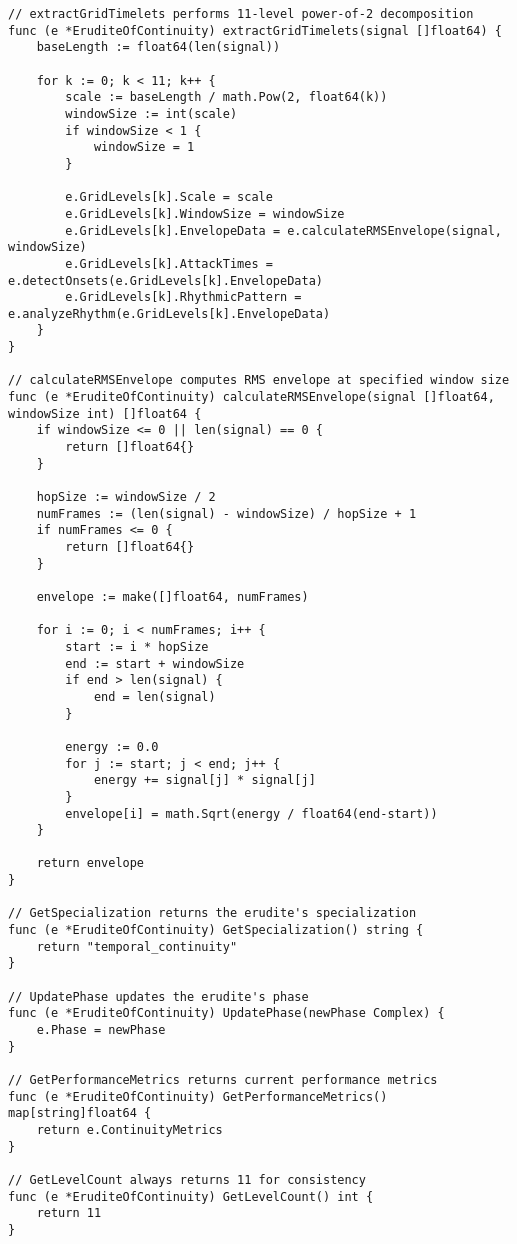 \begin{tcolorbox}[colback=CodeBackground, colframe=DarkGray, title=Erudite of Continuity Implementation, fonttitle=\bfseries]
\begin{verbatim}
// extractGridTimelets performs 11-level power-of-2 decomposition
func (e *EruditeOfContinuity) extractGridTimelets(signal []float64) {
    baseLength := float64(len(signal))
    
    for k := 0; k < 11; k++ {
        scale := baseLength / math.Pow(2, float64(k))
        windowSize := int(scale)
        if windowSize < 1 {
            windowSize = 1
        }
        
        e.GridLevels[k].Scale = scale
        e.GridLevels[k].WindowSize = windowSize
        e.GridLevels[k].EnvelopeData = e.calculateRMSEnvelope(signal, windowSize)
        e.GridLevels[k].AttackTimes = e.detectOnsets(e.GridLevels[k].EnvelopeData)
        e.GridLevels[k].RhythmicPattern = e.analyzeRhythm(e.GridLevels[k].EnvelopeData)
    }
}

// calculateRMSEnvelope computes RMS envelope at specified window size
func (e *EruditeOfContinuity) calculateRMSEnvelope(signal []float64, windowSize int) []float64 {
    if windowSize <= 0 || len(signal) == 0 {
        return []float64{}
    }
    
    hopSize := windowSize / 2
    numFrames := (len(signal) - windowSize) / hopSize + 1
    if numFrames <= 0 {
        return []float64{}
    }
    
    envelope := make([]float64, numFrames)
    
    for i := 0; i < numFrames; i++ {
        start := i * hopSize
        end := start + windowSize
        if end > len(signal) {
            end = len(signal)
        }
        
        energy := 0.0
        for j := start; j < end; j++ {
            energy += signal[j] * signal[j]
        }
        envelope[i] = math.Sqrt(energy / float64(end-start))
    }
    
    return envelope
}

// GetSpecialization returns the erudite's specialization
func (e *EruditeOfContinuity) GetSpecialization() string {
    return "temporal_continuity"
}

// UpdatePhase updates the erudite's phase
func (e *EruditeOfContinuity) UpdatePhase(newPhase Complex) {
    e.Phase = newPhase
}

// GetPerformanceMetrics returns current performance metrics
func (e *EruditeOfContinuity) GetPerformanceMetrics() map[string]float64 {
    return e.ContinuityMetrics
}

// GetLevelCount always returns 11 for consistency
func (e *EruditeOfContinuity) GetLevelCount() int {
    return 11
}
\end{verbatim}
\end{tcolorbox}

